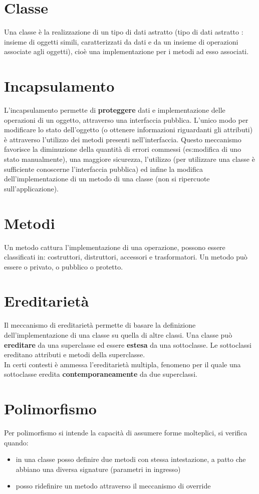 \documentclass[a4paper,12pt]{report}
\begin{document}
	\section{Classe}
	Una classe è la realizzazione di un tipo di dati astratto (tipo di dati astratto : insieme di oggetti simili, caratterizzati da dati e da un insieme di operazioni associate agli oggetti), cioè una implementazione per i metodi ad esso associati.
	\section{Incapsulamento}
	L'incapsulamento permette di \textbf{proteggere} dati e implementazione delle operazioni di un oggetto, attraverso una interfaccia pubblica. L'unico modo per modificare lo stato dell'oggetto (o ottenere informazioni riguardanti gli attributi) è attraverso l'utilizzo dei metodi presenti nell'interfaccia. Questo meccanismo favorisce la diminuzione della quantità di errori commessi (es:modifica di uno stato manualmente), una maggiore sicurezza, l'utilizzo (per utilizzare una classe è sufficiente conoscerne l'interfaccia pubblica) ed infine la modifica dell'implementazione di un metodo di una classe (non si ripercuote sull'applicazione).	
	\section{Metodi}
	Un metodo cattura l'implementazione di una operazione, possono essere classificati in: costruttori, distruttori, accessori e trasformatori. Un metodo può essere o privato, o pubblico o protetto.
	\section{Ereditarietà}
	Il meccanismo di ereditarietà permette di basare la definizione dell'implementazione di una classe su quella di altre classi. Una classe può \textbf{ereditare} da una superclasse ed essere \textbf{estesa} da una sottoclasse. Le sottoclassi ereditano attributi e metodi della superclasse.\\
	In certi contesti è ammessa l'ereditarietà multipla, fenomeno per il quale una sottoclasse eredita \textbf{contemporaneamente} da due superclassi.
	\section{Polimorfismo}
	Per polimorfismo si intende la capacità di assumere forme molteplici, si verifica quando:
	\begin{itemize}
		\item in una classe posso definire due metodi con stessa intestazione, a patto che abbiano una diversa signature (parametri in ingresso)
		\item posso ridefinire un metodo attraverso il meccanismo di override
	\end{itemize}
\end{document}
